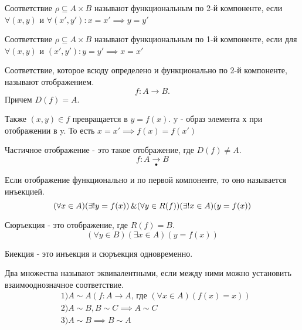 \begin{definition}
Соответствие $\rho \subseteq A\times B$ называют функциональным по 2-й компоненте, если
$\forall (x,y)$ и $\forall (x',y'): x=x' \implies y=y'$
\end{definition}

\begin{definition}
Соответствие $\rho \subseteq A\times B$ называют функциональным по 1-й компоненте, если
для $\forall (x,y)$ и $(x',y'): y=y' \implies x = x'$
\end{definition}

\begin{definition}
Соответствие, которое всюду определено и функционально по 2-й компоненте, называют отображением. \[
f: A \to B 
.\]
Причем $D(f) = A$.
\end{definition}

\medskip

Также $(x,y) \in f$ превращается в $y = f(x)$. y - образ элемента х
при отображении в y. То есть $x=x'\implies f(x)=f(x')$

\begin{definition}
Частичное отображение - это такое отображение, где $D(f) \neq A$. \[
	f: A \underset{\bullet}{\to }B
\] 
\end{definition}

\begin{definition}
Если отображение функционально и по первой компоненте, то оно называется инъекцией. \[
	(\forall x \in A)(\exists! y=f(x))\operatorname{\&}(\forall y \in R(f))(\exists !x \in A)(y=f(x))
\] 
\end{definition}

\begin{definition}
Сюръекция - это отображение, где $R(f) = B$.  \[
	(\forall y \in B)(\exists x \in A)(y = f(x))
\] 
\end{definition}


\begin{definition}
Биекция - это инъекция и сюръекция одновременно.
\end{definition}

\begin{definition}
Два множества называют эквивалентными, если между ними можно установить
взаимооднозначное соответствие.
\begin{align*}
	&1) A \sim A (f: A\to A\text{, где }(\forall x \in A)(f(x)=x)) \\
	&2) A \sim B, B \sim C \implies A \sim C \\
	&3) A\sim B \implies B\sim A
\end{align*}
\end{definition}

